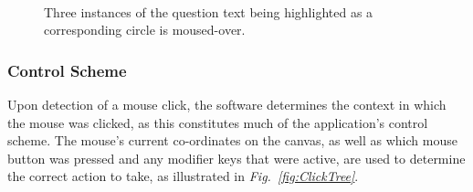 \documentclass[12pt,twoside,notitlepage,xetex]{report}
\begin{document}
{\begin{center}
\begin{figure}[H]
\begin{center}
\\
\vspace{0.5cm}
\end{center}
\caption{Three instances of the question text being highlighted as a corresponding circle is moused-over.}
\label{fig:Highlighting}
\end{figure}
\end{center}

\subsubsection{Control Scheme}

Upon detection of a mouse click, the software determines the context in which the mouse was clicked, as this constitutes much of the application's control scheme.  The mouse's current co-ordinates on the canvas, as well as which mouse button was pressed and any modifier keys that were active, are used to determine the correct action to take, as illustrated in \emph{Fig.~\ref{fig:ClickTree}}.

}
\end{document}
